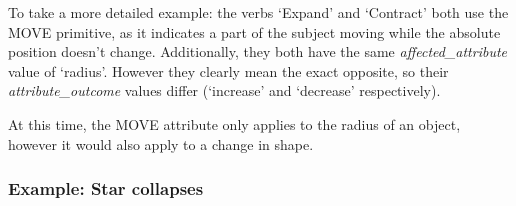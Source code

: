 \documentclass[dissertation.tex]{subfiles}
\begin{document}
    To take a more detailed example: the verbs `Expand' and `Contract' both use the MOVE primitive, as it indicates a part of the subject moving while the absolute position doesn't change. Additionally, they both have the same \emph{affected\_attribute} value of `radius'. However they clearly mean the exact opposite, so their \emph{attribute\_outcome} values differ (`increase' and `decrease' respectively).

    At this time, the MOVE attribute only applies to the radius of an object, however it would also apply to a change in shape.


    \subsubsection{Example: Star collapses}
\end{document}
